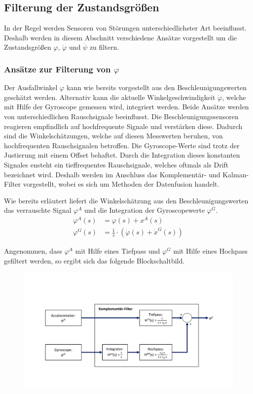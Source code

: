 \subsection{Filterung der Zustandsgrößen}
In der Regel werden Sensoren von Störungen unterschiedlichster Art beeinflusst. Deshalb werden in diesem Abschnitt verschiedene Ansätze vorgestellt um die Zustandsgrößen $\varphi$, $\dot{\varphi}$ und $\dot{\psi}$ zu filtern. 

\subsubsection{Ansätze zur Filterung von $\varphi$}
Der Ausfallwinkel $\varphi$ kann wie bereits vorgestellt aus den Beschleunigungswerten geschätzt werden. Alternativ kann die aktuelle Winkelgeschwindigkeit $\dot{\varphi}$, welche mit Hilfe der Gyroscope gemessen wird, integriert werden. Beide Ansätze werden von unterschiedlichen Rauschsignale beeinflusst. Die Beschleunigungssensoren reagieren empfindlich auf hochfrequente Signale und verstärken diese. Dadurch sind die Winkelschätzungen, welche auf diesen Messwerten beruhen, von hochfrequenten Rauschsignalen betroffen. 
Die Gyroscope-Werte sind trotz der Justierung mit einem Offset behaftet. Durch die Integration dieses konstanten Signales ensteht ein tieffrequentes Rauschsignale, welches oftmals als Drift bezeichnet wird. 
Deshalb werden im Anschluss das Komplementär- und Kalman-Filter vorgestellt, wobei es sich um Methoden der Datenfusion handelt.

Wie bereits erläutert liefert die Winkelschätzung aus den Beschleunigungswerten das verrauschte Signal $\varphi^A$ und die Integration der Gyroscopewerte $\varphi^G$.
\begin{equation}
\begin{split}
\varphi^A(s) &= \varphi(s) + x^A(s) \\
\varphi^G(s) &= \frac{1}{s} \cdot (\dot{\varphi}(s) + \dot{x}^G(s)) 
\end{split}
\end{equation}

Angenommen, dass $\varphi^A$ mit Hilfe eines Tiefpass und $\varphi^G$ mit Hilfe eines Hochpass gefiltert werden, so ergibt sich das folgende Blockschaltbild.

\begin{figure}[!h]
\includegraphics[scale=0.5,trim={0 3cm 0 4cm},clip]{img/Komp_CuBa_1D}
\end{figure}


